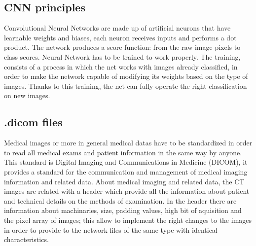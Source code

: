 \documentclass[../main.tex]{subfiles}
\begin{document}
\subsection{CNN principles}
Convolutional Neural Networks are made up of artificial neurons that have learnable weights and biases, each neuron receives inputs and performs a dot product. The network produces a score function: from the raw image pixels to class scores. 
Neural Network has to be trained to work properly. The training, consists of a process in which the net works with images already classified, in order to make the network capable of modifying its weights based on the type of images. Thanks to this training, the net can fully operate the right classification on new images.
\vspace{5mm}

\subsection{.dicom files}
Medical images or more in general medical datas have to be standardized in order to read all medical exams and patient information in the same way by anyone. This standard is Digital Imaging and Communications in Medicine (DICOM), it provides a standard for the communication and management of medical imaging information and related data.
About medical imaging and related data, the CT images are related with a header which provide all the information about patient and technical details on the methods of examination. In the header there are information about machinaries, size, padding values, high bit of aquisition and the pixel array of images; this allow to implement the right changes to the images in order to provide to the network files of the same type with identical characteristics.
\vspace{5mm}
\end{document}
